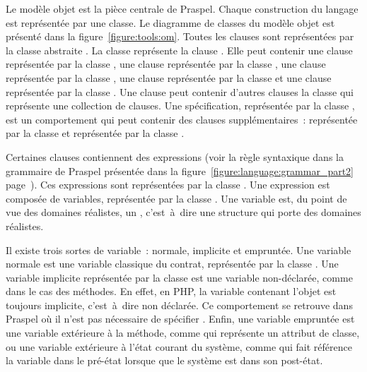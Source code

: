 Le modèle objet est la pièce centrale de Praspel. Chaque construction du langage
est représentée par une classe. Le diagramme de classes du modèle objet est
présenté dans la figure~\ref{figure:tools:om}. Toutes les clauses sont
représentées par la classe abstraite . La classe 
représente la clause \abehavior. Elle peut contenir une clause \arequires
représentée par la classe , une clause \aensures représentée par
la classe , une clause \athrowable représentée par la classe
, une clause \adescription représentée par la classe
 et une clause \adefault représentée par la classe
. Une clause \abehavior peut contenir d'autres clauses
\abehavior \via la classe  qui représente une collection de
clauses. Une spécification, représentée par la classe , est
un comportement qui peut contenir des clauses supplémentaires~: \ainvariant
représentée par la classe  et \ais représentée par la classe
.

Certaines clauses contiennent des expressions (voir la règle syntaxique
 dans la grammaire de Praspel présentée dans la
figure~\ref{figure:language:grammar_part2}
page~\pageref{figure:language:grammar_part2}). Ces expressions sont représentées
par la classe . Une expression est composée de variables,
représentée par la classe . Une variable est, du point de vue des
domaines réalistes, un , c'est~à~dire une structure qui porte
des domaines réalistes.

Il existe trois sortes de variable~: normale, implicite et empruntée. Une
variable normale est une variable classique du contrat, représentée par la
classe . Une variable implicite représentée par la classe
 est une variable non-déclarée, comme  dans le cas des
méthodes. En effet, en PHP, la variable contenant l'objet est toujours
implicite, c'est~à~dire non déclarée. Ce comportement se retrouve dans Praspel
où il n'est pas nécessaire de spécifier . Enfin, une variable
empruntée est une variable extérieure à la méthode, comme  qui
représente un attribut de classe, ou une variable extérieure à l'état courant du
système, comme  qui fait référence la variable  dans le
pré-état lorsque que le système est dans son post-état.

\begin{sidewaysfigure}


\caption{\label{figure:tools:om} Modèle objet de Praspel.}

\end{sidewaysfigure}

